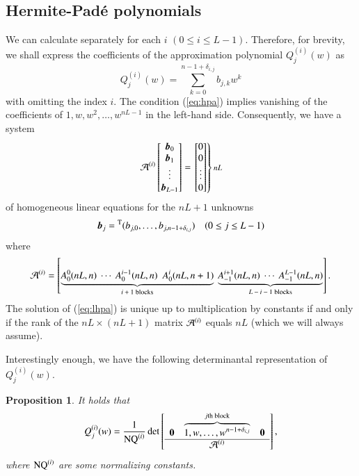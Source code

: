 \documentclass[12pt]{article}
\newtheorem{prop}[thm]{Proposition}
\numberwithin{equation}{section}
\begin{document}
\subsection{Hermite-Pad\'e polynomials}
\label{subsect:dethpa}
We can calculate separately for each $i$ $(0 \leq i \leq L-1)$.
Therefore, for brevity,
we shall express the coefficients of
the approximation polynomial
$Q_j^{(i)}(w)$
as
\[
Q_j^{(i)}(w)=\sum_{k=0}^{ n-1+\delta_{i,j}  } b_{j,k}w^k
\]
with omitting the index $i$. 
The condition (\ref{eq:hpa})
implies vanishing of
the coefficients of 
$1, w, w^2, \ldots, w^{nL-1}$ in the left-hand side.
Consequently, we have a system 
\begin{equation}
\label{eq:lhpa}
{\cal A}^{(i)}\begin{bmatrix}
{\boldsymbol b}_0 \\
{\boldsymbol b}_1 \\
 \vdots \\{\boldsymbol b}_{L-1}
\end{bmatrix}
= 
\left.
 \begin{bmatrix}
0 \\ 0 \\\vdots \\ 0
\end{bmatrix}
\right\} \text{\footnotesize $nL$}
\end{equation}
of homogeneous linear equations
for the $nL+1$ unknowns
\[{\boldsymbol b}_j
={}^{\rm T}( b_{j,0},  \ldots , b_{j,n-1+\delta_{i,j}})
\quad
(0 \leq j \leq L-1)
\]
where 
\[
{\cal A}^{(i)}
=
\left[
\underbrace{A^0_0(nL,n)  \ \cdots \   A^{i-1}_0(nL,n) \
 \  A^i_0(nL,n+1)}_{\text{$i+1$ blocks}}
   \ 
\underbrace{A^{i+1}_{-1}(nL,n)  \
  \cdots    \
 A^{L-1}_{-1}(nL,n)}_{\text{$L-i-1$ blocks}}
\right].
\]
The solution of (\ref{eq:lhpa}) is unique up to multiplication by constants
if and only if  the rank of the
$nL \times (nL+1)$ matrix
${\cal A}^{(i)}$ equals $nL$
(which we will always assume).


Interestingly enough, we have the following determinantal representation of $Q^{(i)}_j(w)$.

\begin{prop}  \label{prop:detq}
It holds that
\begin{equation} \label{eq:Q}
Q^{(i)}_j(w) 
=\frac{1}{{\rm NQ}^{(i)}}
\det \left[
\begin{array}{ccc}
{\boldsymbol 0} &
\overbrace{1, w, \ldots, w^{n-1+\delta_{i,j}}}^{\text{\rm $j$th block}}
 &{\boldsymbol 0} 
 \\  \hline
&{\cal A}^{(i)}&
\end{array}
\right],
\end{equation}
where ${\rm NQ}^{(i)}$ are some normalizing constants. 
\end{prop}
\end{document}
